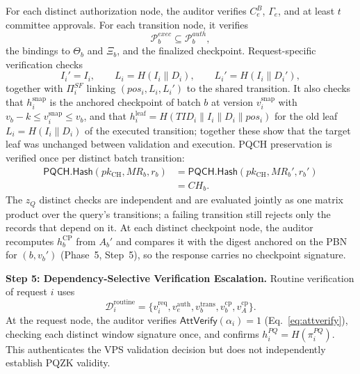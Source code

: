 \documentclass[lettersize,journal]{IEEEtran}
\begin{document}
For each distinct authorization node, the auditor verifies $C_e^B$,
$\Gamma_e$, and at least $t$ committee approvals. For each transition
node, it verifies
\begin{equation}
\mathcal{P}_b^{exec}\subseteq\mathcal{P}_b^{auth},
\end{equation}
the bindings to $\Theta_b$ and $\Xi_b$, and the finalized checkpoint.
Request-specific verification checks
\begin{equation}
I_i'=I_i,\qquad
L_i=H(I_i\parallel D_i),\qquad
L_i'=H(I_i\parallel D_i'),
\end{equation}
together with $\Pi_i^{SF}$ linking
$(pos_i,L_i,L_i')$ to the shared transition.
\textcolor{e1}{It also checks that $h_i^{\mathrm{snap}}$ is the anchored
checkpoint of batch $b$ at version $v_i^{\mathrm{snap}}$ with
$v_b-k\le v_i^{\mathrm{snap}}\le v_b$, and that
$h_i^{\mathrm{leaf}}=H(TID_i\parallel I_i\parallel D_i\parallel pos_i)$
for the old leaf $L_i=H(I_i\parallel D_i)$ of the executed transition;
together these show that the target leaf was unchanged between validation
and execution.} PQCH preservation is
verified once per distinct batch transition:
\begin{equation}
\begin{aligned}
\mathsf{PQCH.Hash}(pk_{\mathrm{CH}},MR_b,r_b)
&=
\mathsf{PQCH.Hash}(pk_{\mathrm{CH}},MR_b',r_b')\\
&=CH_b.
\end{aligned}
\end{equation}
\textcolor{e3}{The $z_Q$ distinct checks are independent and are
evaluated jointly as one matrix product over the query's transitions; a
failing transition still rejects only the records that depend on it. At
each distinct checkpoint node, the auditor recomputes $h_b^{\mathrm{CP}}$
from $A_b'$ and compares it with the digest anchored on the PBN for
$(b,v_b')$ (Phase~5, Step~5), so the response carries no checkpoint
signature.}

\medskip
\noindent\textbf{Step 5: Dependency-Selective Verification Escalation.}
Routine verification of request $i$ uses
\begin{equation}
\mathcal{D}_i^{\mathrm{routine}}
=
\{
v_i^{\mathrm{req}},
v_e^{\mathrm{auth}},
v_b^{\mathrm{trans}},
v_b^{\mathrm{cp}},
v_A^{\mathrm{cp}}
\}.
\end{equation}
At the request node, the auditor verifies
\textcolor{e2}{$\mathsf{AttVerify}(\alpha_i)=1$
(Eq.~\eqref{eq:attverify}), checking each distinct window signature
once,}
and confirms $h_i^{PQ}=H(\pi_i^{PQ})$. This authenticates the VPS
validation decision but does not independently establish PQZK validity.
\end{document}
